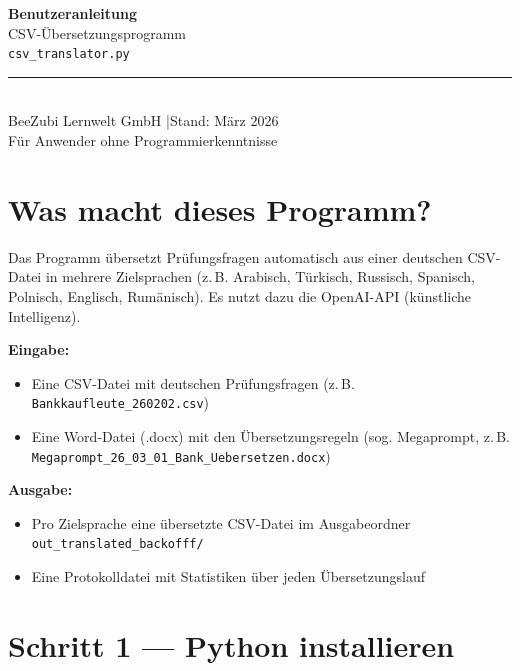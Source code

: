 \documentclass[a4paper,11pt]{article}
\begin{document}
\begin{center}
  \vspace*{1cm}
  {\LARGE\bfseries\color{beezubi} Benutzeranleitung}\\[0.4em]
  {\Large CSV-Übersetzungsprogramm}\\[0.6em]
  {\large\color{grau}\texttt{csv\_translator.py}}\\[1.2em]
  \rule{0.6\linewidth}{0.4pt}\\[0.6em]
  {\normalsize BeeZubi Lernwelt GmbH \quad|\quad Stand: März 2026}\\[0.3em]
  {\small\color{grau}Für Anwender ohne Programmierkenntnisse}
  \vspace{0.8cm}
\end{center}

\section{Was macht dieses Programm?}

Das Programm übersetzt Prüfungsfragen automatisch aus einer deutschen CSV-Datei in
mehrere Zielsprachen (z.\,B. Arabisch, Türkisch, Russisch, Spanisch, Polnisch,
Englisch, Rumänisch). Es nutzt dazu die OpenAI-API (künstliche Intelligenz).

\textbf{Eingabe:}
\begin{itemize}[itemsep=2pt]
  \item Eine CSV-Datei mit deutschen Prüfungsfragen (z.\,B. \texttt{Bankkaufleute\_260202.csv})
  \item Eine Word-Datei (.docx) mit den Übersetzungsregeln (sog. Megaprompt,
        z.\,B. \texttt{Megaprompt\_26\_03\_01\_Bank\_Uebersetzen.docx})
\end{itemize}

\textbf{Ausgabe:}
\begin{itemize}[itemsep=2pt]
  \item Pro Zielsprache eine übersetzte CSV-Datei im Ausgabeordner
        \texttt{out\_translated\_backofff/}
  \item Eine Protokolldatei mit Statistiken über jeden Übersetzungslauf
\end{itemize}

\section{Schritt 1 — Python installieren}
\end{document}
